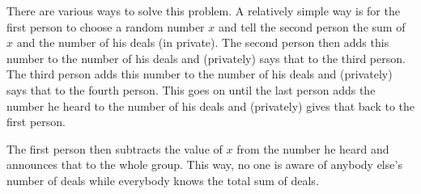 \begin{solution}
There are various ways to solve this problem.
A relatively simple way is for the first person to choose a random number $x$ and tell the second person the sum of $x$ and the number of his deals (in private). The second person then adds this number to the number of his deals and (privately) says that to the third person. The third person adds this number to the number of his deals and (privately) says that to the fourth person. This goes on until the last person adds the number he heard to the number of his deals and (privately) gives that back to the first person.

The first person then subtracts the value of $x$ from the number he heard and announces that to the whole group. This way, no one is aware of anybody else's number of deals while everybody knows the total sum of deals.
\end{solution}